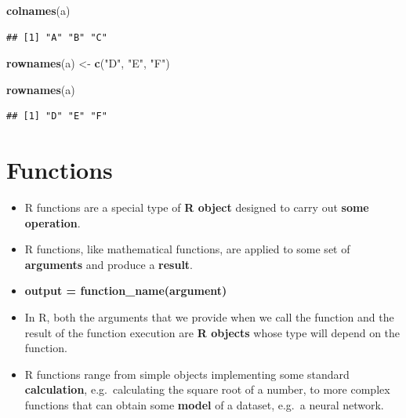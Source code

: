 \documentclass[]{book}
\newenvironment{Shaded}{\begin{snugshade}}{\end{snugshade}}
\newcommand{\KeywordTok}[1]{\textcolor[rgb]{0.13,0.29,0.53}{\textbf{{#1}}}}
\newcommand{\StringTok}[1]{\textcolor[rgb]{0.31,0.60,0.02}{{#1}}}
\newcommand{\NormalTok}[1]{{#1}}
\providecommand{\tightlist}{%
  \setlength{\itemsep}{0pt}\setlength{\parskip}{0pt}}
\begin{document}
\begin{Shaded}
\begin{Highlighting}[]
\KeywordTok{colnames}\NormalTok{(a) }
\end{Highlighting}
\end{Shaded}

\begin{verbatim}
## [1] "A" "B" "C"
\end{verbatim}

\begin{Shaded}
\begin{Highlighting}[]
\KeywordTok{rownames}\NormalTok{(a) <-}\StringTok{ }\KeywordTok{c}\NormalTok{(}\StringTok{"D"}\NormalTok{, }\StringTok{"E"}\NormalTok{, }\StringTok{"F"}\NormalTok{)}
\end{Highlighting}
\end{Shaded}

\begin{Shaded}
\begin{Highlighting}[]
\KeywordTok{rownames}\NormalTok{(a)}
\end{Highlighting}
\end{Shaded}

\begin{verbatim}
## [1] "D" "E" "F"
\end{verbatim}

\section{Functions}\label{functions}

\begin{itemize}
\tightlist
\item
  R functions are a special type of \textbf{R object} designed to carry
  out \textbf{some operation}.
\item
  R functions, like mathematical functions, are applied to some set of
  \textbf{arguments} and produce a \textbf{result}.
\item
  \textbf{output = function\_name(argument)}
\item
  In R, both the arguments that we provide when we call the function and
  the result of the function execution are \textbf{R objects} whose type
  will depend on the function.
\item
  R functions range from simple objects implementing some standard
  \textbf{calculation}, e.g.~calculating the square root of a number, to
  more complex functions that can obtain some \textbf{model} of a
  dataset, e.g.~a neural network.
\end{itemize}
\end{document}
